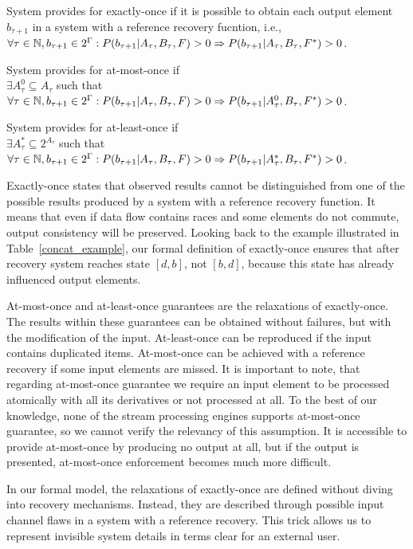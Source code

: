 \begin{definition}{System provides for exactly-once}
if it is possible to obtain each output element $b_{\tau+1}$ in a system with a reference recovery fucntion, i.e.,\\ 
$\forall{\tau \in \mathbb{N}}, b_{\tau+1}\in 2^{\Gamma}: P(b_{\tau+1}|A_{\tau},B_\tau,F)>0 \Rightarrow \\ P(b_{\tau+1}|A_{\tau},B_\tau,F^{*})>0$.
\end{definition}

\begin{definition}{System provides for at-most-once}
if \\
$\exists{A^{0}_{\tau}\subseteq{A_{\tau}}}$ such that \\
$\forall{\tau \in \mathbb{N},{b_{\tau+1}\in 2^{\Gamma}}}: P(b_{\tau+1}|A_{\tau},B_\tau,F)>0 \Rightarrow \\ P(b_{\tau+1}|A^{0}_{\tau},B_\tau,F^{*})>0$.
\end{definition}

\begin{definition}{System provides for at-least-once}
if \\
$\exists{A^{*}_{\tau}\subseteq{2^{A_{\tau}}}}$ such that \\
$\forall{\tau \in \mathbb{N}, {b_{\tau+1} \in 2^{\Gamma}}}: P(b_{\tau+1}|A_{\tau},B_\tau,F)>0 \Rightarrow \\ P(b_{\tau+1}|A^{*}_{\tau},B_\tau,F^{*})>0$.
\end{definition}

Exactly-once states that observed results cannot be distinguished from one of the possible results produced by a system with a reference recovery function. It means that even if data flow contains races and some elements do not commute, output consistency will be preserved. Looking back to the example illustrated in Table~\ref{concat_example}, our formal definition of exactly-once ensures that after recovery system reaches state $[d,b]$, not $[b,d]$, because this state has already influenced output elements.

At-most-once and at-least-once guarantees are the relaxations of exactly-once. The results within these guarantees can be obtained without failures, but with the modification of the input. At-least-once can be reproduced if the input contains duplicated items. At-most-once can be achieved with a reference recovery if some input elements are missed. It is important to note, that regarding at-most-once guarantee we require an input element to be processed atomically with all its derivatives or not processed at all. To the best of our knowledge, none of the stream processing engines supports at-most-once guarantee, so we cannot verify the relevancy of this assumption. It is accessible to provide at-most-once by producing no output at all, but if the output is presented, at-most-once enforcement becomes much more difficult.  

In our formal model, the relaxations of exactly-once are defined without diving into recovery mechanisms. Instead, they are described through possible input channel flaws in a system with a reference recovery. This trick allows us to represent invisible system details in terms clear for an external user.

